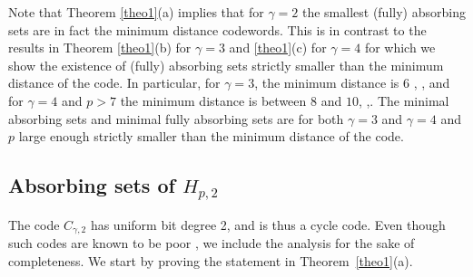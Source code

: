 Note that Theorem \ref{theo1}(a) implies that for $\gamma=2$ the
smallest (fully) absorbing sets are in fact the minimum distance
codewords. This is in contrast to the results in Theorem
\ref{theo1}(b) for $\gamma=3$ and \ref{theo1}(c) for $\gamma=4$ for
which we show the existence of (fully) absorbing sets strictly
smaller than the minimum distance of the code. In particular, for
$\gamma=3$, the minimum distance is 6 \cite{helles},
\cite{mittel:02}, and for $\gamma=4$ and $p>7$ the minimum distance
is between $8$ and $10$, \cite{helles},\cite{mittel:02}. The minimal
absorbing sets and minimal fully absorbing sets  are for both
$\gamma=3$ and $\gamma=4$ and $p$ large enough strictly smaller than
the minimum distance of the code.
\vspace{-0.00in}\subsection{Absorbing sets of
$H_{p,2}$}\label{theo12}

The code $C_{\gamma,2}$ has uniform bit degree 2, and is thus a
cycle code. Even though such codes are known to be poor
\cite{peterson}, we include the analysis for the sake of
completeness.
We start by proving the statement in Theorem~\ref{theo1}(a).

